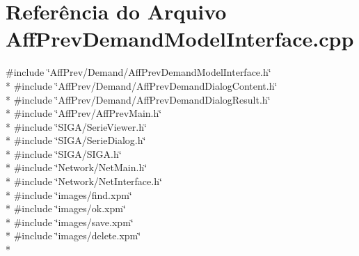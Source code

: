 \section{Referência do Arquivo Aff\+Prev\+Demand\+Model\+Interface.\+cpp}
\label{_aff_prev_demand_model_interface_8cpp}
{\ttfamily \#include \char`\"{}Aff\+Prev/\+Demand/\+Aff\+Prev\+Demand\+Model\+Interface.\+h\char`\"{}}\\*
{\ttfamily \#include \char`\"{}Aff\+Prev/\+Demand/\+Aff\+Prev\+Demand\+Dialog\+Content.\+h\char`\"{}}\\*
{\ttfamily \#include \char`\"{}Aff\+Prev/\+Demand/\+Aff\+Prev\+Demand\+Dialog\+Result.\+h\char`\"{}}\\*
{\ttfamily \#include \char`\"{}Aff\+Prev/\+Aff\+Prev\+Main.\+h\char`\"{}}\\*
{\ttfamily \#include \char`\"{}S\+I\+G\+A/\+Serie\+Viewer.\+h\char`\"{}}\\*
{\ttfamily \#include \char`\"{}S\+I\+G\+A/\+Serie\+Dialog.\+h\char`\"{}}\\*
{\ttfamily \#include \char`\"{}S\+I\+G\+A/\+S\+I\+G\+A.\+h\char`\"{}}\\*
{\ttfamily \#include \char`\"{}Network/\+Net\+Main.\+h\char`\"{}}\\*
{\ttfamily \#include \char`\"{}Network/\+Net\+Interface.\+h\char`\"{}}\\*
{\ttfamily \#include \char`\"{}images/find.\+xpm\char`\"{}}\\*
{\ttfamily \#include \char`\"{}images/ok.\+xpm\char`\"{}}\\*
{\ttfamily \#include \char`\"{}images/save.\+xpm\char`\"{}}\\*
{\ttfamily \#include \char`\"{}images/delete.\+xpm\char`\"{}}\\*

